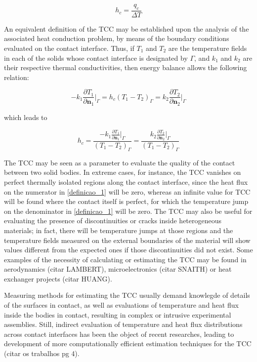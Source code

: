 \documentclass[conference,compsoc]{IEEEtran}
\begin{document}
\begin{equation}
h_c = \frac{q_c}{\Delta T} \label{definicao_1}
\end{equation}

An equivalent definition of the TCC may be established upon the analysis of the associated heat conduction problem, by means of the boundary conditions evaluated on the contact interface. Thus, if $T_1$ and $T_2$ are the temperature fields in each of the solids whose contact interface is designated by $\Gamma$, and  $k_1$ and $k_2$ are their respective thermal conductivities, then energy balance allows the following relation:

\begin{equation}
-k_1\frac{\partial T_1}{\partial \mathbf{n}_1}\bigg|_\Gamma
=
h_c(T_1 - T_2)_\Gamma
=
k_2\frac{\partial T_2}{\partial \mathbf{n}_2}\bigg|_\Gamma \label{definicao_2}
\end{equation}

which leads to

\begin{equation}
h_c = \frac{-k_1\displaystyle\frac{\partial T_1}{\partial \mathbf{n}_1}\bigg|_\Gamma}{(T_1 - T_2)_\Gamma} = \frac{k_2\displaystyle\frac{\partial T_2}{\partial \mathbf{n}_2}\bigg|_\Gamma}{(T_1 - T_2)_\Gamma} \label{eq:definicao_3}
\end{equation}

The TCC may be seen as a parameter to evaluate the quality of the contact between two solid bodies. In extreme cases, for instance, the TCC vanishes on perfect thermally isolated regions along the contact interface, since the heat flux on the numerator in \eqref{definicao_1} will be zero, whereas an infinite value for TCC will be found where the contact itself is perfect, for which the temperature jump on the denominator in \eqref{definicao_1} will be zero. The TCC may also be useful for evaluating the presence of discontinuities or cracks inside heterogeneous materials; in fact, there will be temperature jumps at those regions and the temperature fields measured on the external boundaries of the material will show values different from the expected ones if those discontinuities did not exist. Some examples of the necessity of calculating or estimating the TCC may be found in aerodynamics (citar LAMBERT), microelectronics (citar SNAITH) or heat exchanger projects (citar HUANG). 

Measuring methods for estimating the TCC usually demand knowlegde of details of the surfaces in contact, as well as evaluations of temperature and heat flux inside the bodies in contact, resulting in complex or intrusive experimental assemblies. Still, indirect evaluation of temperature and heat flux distributions across contact interfaces has been the object of recent researches, leading to development of more computationally efficient estimation techniques for the TCC (citar os trabalhos pg 4). 
\end{document}
